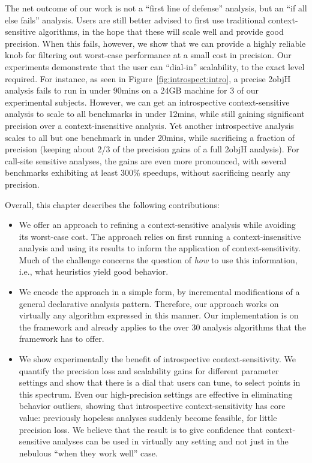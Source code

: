 The net outcome of our work is not a ``first line of defense'' analysis, but an ``if all else fails'' analysis. Users are still better advised to first use traditional context-sensitive algorithms, in the hope that these will scale well and provide good precision. When this fails, however, we show that we can provide a highly reliable knob for filtering out worst-case performance at a small cost in precision. Our experiments demonstrate that the user can ``dial-in'' scalability, to the exact level required. For instance, as seen in Figure~\ref{fig:introspect:intro}, a precise 2objH analysis fails to run in under 90mins on a 24GB machine for 3 of our experimental subjects. However, we can get an introspective context-sensitive analysis to scale to all benchmarks in under 12mins, while still gaining significant precision over a context-insensitive analysis. Yet another introspective analysis scales to all but one benchmark in under 20mins, while sacrificing a fraction of precision (keeping about 2/3 of the precision gains of a full 2objH analysis). For call-site sensitive analyses, the gains are even more pronounced, with several benchmarks exhibiting at least 300\% speedups, without sacrificing nearly any precision.

Overall, this chapter describes the following contributions:

\begin{itemize}
\item We offer an approach to refining a context-sensitive analysis while avoiding its worst-case cost. The approach relies on first running a context-insensitive analysis and using its results to inform the application of context-sensitivity. Much of the challenge concerns the question of \emph{how} to use this information, i.e.,  what heuristics yield good behavior.

\item We encode the approach in a simple form, by incremental modifications of a general declarative analysis pattern. Therefore, our approach works on virtually any algorithm expressed in this manner. Our implementation is on the \doop{} framework and already applies to the over 30 analysis algorithms that the framework has to offer.

\item We show experimentally the benefit of introspective context-sensitivity. We quantify the precision loss and scalability gains for different parameter settings and show that there is a dial that users can tune, to select points in this spectrum. Even our high-precision settings are effective in eliminating behavior outliers, showing that introspective context-sensitivity has core value: previously hopeless analyses suddenly become feasible, for little precision loss. We believe that the result is to give confidence that context-sensitive analyses can be used in virtually any setting and not just in the nebulous ``when they work well'' case.
\end{itemize}

